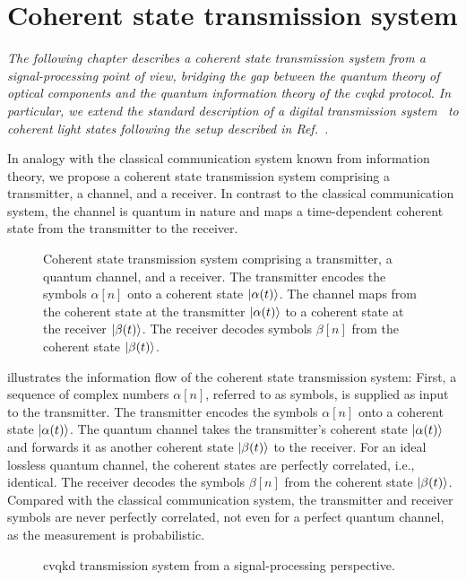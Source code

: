 \chapter{Coherent state transmission system}

\textit{The following chapter describes a coherent state transmission system from a signal-processing point of view, bridging the gap between the quantum theory of optical components and the quantum information theory of the \gls{cvqkd} protocol. In particular, we extend the standard description of a digital transmission system~\cite{Gallager2008,Nossek2015,Oppenheim1989,Proakis2007} to coherent light states following the setup described in Ref.~\cite{Brunner2017}.}

In analogy with the classical communication system known from information theory, we propose a coherent state transmission system comprising a transmitter, a channel, and a receiver.
In contrast to the classical communication system, the channel is quantum in nature and maps a time-dependent coherent state from the transmitter to the receiver.
\begin{figure}[htb]
	\centering
	
	\caption{Coherent state transmission system comprising a transmitter, a quantum channel, and a receiver. The transmitter encodes the symbols $\alpha[n]$ onto a coherent state $\lvert\alpha(t)\rangle$. The channel maps from the coherent state at the transmitter $\lvert\alpha(t)\rangle$ to a coherent state at the receiver $\lvert\beta(t)\rangle$. The receiver decodes symbols $\beta[n]$ from the coherent state $\lvert\beta(t)\rangle$.}\label{fig:transmission_system}
\end{figure}
 illustrates the information flow of the coherent state transmission system:
First, a sequence of complex numbers $\alpha[n]$, referred to as symbols, is supplied as input to the transmitter.
The transmitter encodes the symbols $\alpha[n]$ onto a coherent state $\lvert\alpha(t)\rangle$.
The quantum channel takes the transmitter's coherent state $\lvert\alpha(t)\rangle$ and forwards it as another coherent state $\lvert\beta(t)\rangle$ to the receiver.
For an ideal lossless quantum channel, the coherent states are perfectly correlated, i.e., identical.
The receiver decodes the symbols $\beta[n]$ from the coherent state $\lvert\beta(t)\rangle$.
Compared with the classical communication system, the transmitter and receiver symbols are never perfectly correlated, not even for a perfect quantum channel, as the measurement is probabilistic.
\begin{figure}[htb]
	\centering
	
	\caption{\Gls{cvqkd} transmission system from a signal-processing perspective.}
\end{figure}

